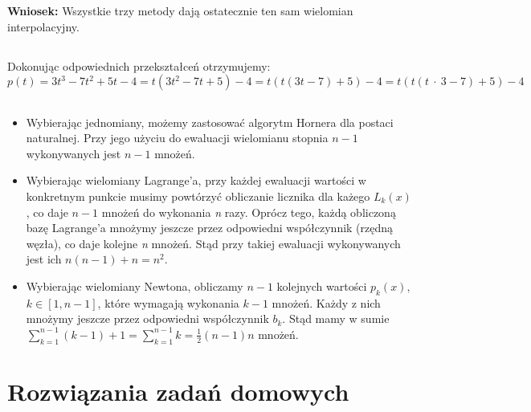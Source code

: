 \documentclass{article}
\begin{document}
\textbf{Wniosek:} Wszystkie trzy metody dają ostatecznie ten sam wielomian interpolacyjny.

\subsection{}
Dokonując odpowiednich przekształceń otrzymujemy:
\[p(t) = 3t^3 - 7t^2 + 5t - 4 = t(3t^2 - 7t + 5) - 4 = t(t(3t - 7) + 5) - 4 = t(t(t\ \cdot\ 3 - 7) + 5) - 4\]

\subsection{}
\begin{itemize}
    \item Wybierając jednomiany, możemy zastosować algorytm Hornera dla postaci naturalnej. Przy jego użyciu do ewaluacji wielomianu stopnia \(n-1\) wykonywanych jest \(n-1\) mnożeń.
    \item Wybierając wielomiany Lagrange’a, przy każdej ewaluacji wartości w konkretnym punkcie musimy powtórzyć obliczanie licznika dla każego \(L_k(x)\), co daje \(n-1\) mnożeń do wykonania \textit{n} razy. Oprócz tego, każdą obliczoną bazę Lagrange’a mnożymy jeszcze przez odpowiedni współczynnik (rzędną węzła), co daje kolejne \textit{n} mnożeń. Stąd przy takiej ewaluacji wykonywanych jest ich \(n(n-1) + n = n^2\).
    \item Wybierając wielomiany Newtona, obliczamy \(n-1\) kolejnych wartości \(p_k(x),\)
    \(k \in [1, n-1]\), które wymagają wykonania \(k-1\) mnożeń. Każdy z nich mnożymy jeszcze przez odpowiedni współczynnik \(b_k\). Stąd mamy w sumie \(\sum_{k=1}^{n-1} (k-1)+1 = \sum_{k=1}^{n-1} k = \frac{1}{2}(n-1)n\) mnożeń.
\end{itemize}

\section{Rozwiązania zadań domowych}
\end{document}
